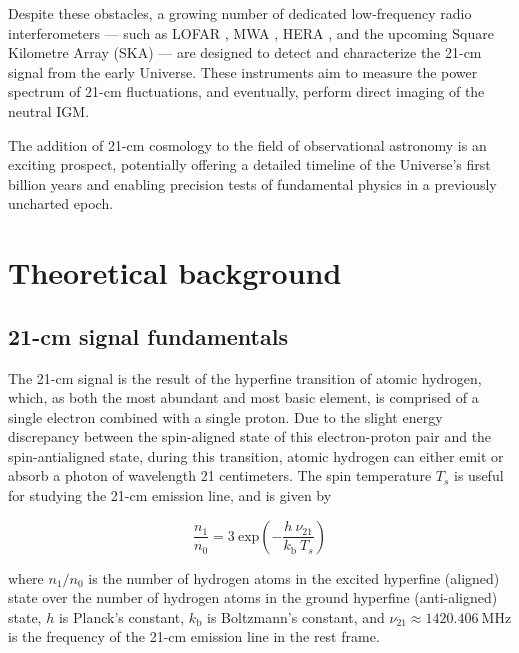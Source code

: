 \documentclass[floats,floatfix,showpacs,amssymb,prd,superscriptaddress,nofootinbib, 11pt]{revtex4-2} %
\begin{document}
Despite these obstacles, a growing number of dedicated low-frequency radio interferometers — such as LOFAR \citep{van_Haarlem_2013}, MWA \citep{Beardsley_2019}, HERA \citep{DeBoer_2017}, and the upcoming Square Kilometre Array (SKA) \citep{Dewdney_2009} — are designed to detect and characterize the 21-cm signal from the early Universe. These instruments aim to measure the power spectrum of 21-cm fluctuations, and eventually, perform direct imaging of the neutral IGM.

The addition of 21-cm cosmology to the field of observational astronomy is an exciting prospect, potentially offering a detailed timeline of the Universe's first billion years and enabling precision tests of fundamental physics in a previously uncharted epoch.

\newpage
\section{Theoretical background}
\subsection{21-cm signal fundamentals}
The 21-cm signal is the result of the hyperfine transition of atomic hydrogen, which, as both the most abundant and most basic element, is comprised of a single electron combined with a single proton. Due to the slight energy discrepancy between the spin-aligned state of this electron-proton pair and the spin-antialigned state, during this transition, atomic hydrogen can either emit or absorb a photon of wavelength 21 centimeters. The spin temperature $T_s$ is useful for studying the 21-cm emission line, and is given by \citep{Purcell_Field_1956, Scott_Rees_1990}

\begin{equation}
    \frac{n_1}{n_0} = 3 ~ \text{exp} \left( -\frac{h ~ \nu_{21}}{k_\text{b} ~ T_s} \right)
\end{equation}

\noindent where $n_1/n_0$ is the number of hydrogen atoms in the excited hyperfine (aligned) state over the number of hydrogen atoms in the ground hyperfine (anti-aligned) state, $h$ is Planck's constant, $k_\text{b}$ is Boltzmann's constant, and $\nu_{21} \approx 1420.406 ~\text{MHz}$ is the frequency of the 21-cm emission line in the rest frame. 
\end{document}

